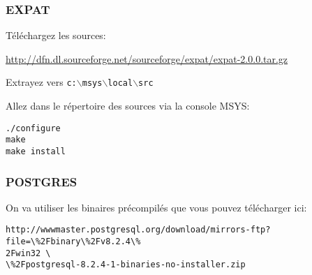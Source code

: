 % 
% 
% 
% 

\subsubsection{EXPAT}
Téléchargez les sources:

\url{http://dfn.dl.sourceforge.net/sourceforge/expat/expat-2.0.0.tar.gz}

Extrayez vers \texttt{c:$\backslash$msys$\backslash$local$\backslash$src}

Allez dans le répertoire des sources via la console MSYS:

\begin{verbatim}
./configure
make
make install
\end{verbatim}

% 
% 

\subsubsection{POSTGRES}
On va utiliser les binaires précompilés que vous pouvez télécharger ici:

\begin{verbatim}
http://wwwmaster.postgresql.org/download/mirrors-ftp?file=\%2Fbinary\%2Fv8.2.4\%
2Fwin32 \
\%2Fpostgresql-8.2.4-1-binaries-no-installer.zip
\end{verbatim}

